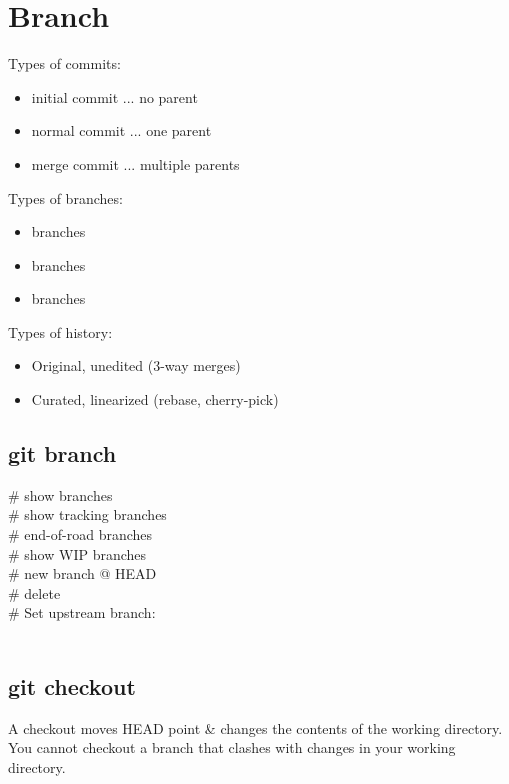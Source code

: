 \section{Branch}
Types of commits:
\begin{itemize}
    \item initial commit ... no parent
    \item normal commit ... one parent
    \item merge commit ... multiple parents
\end{itemize}
Types of branches:
\begin{itemize}
    \item {} branches
    \item {} branches
    \item {} branches
\end{itemize}
Types of history:
\begin{itemize}
    \item Original, unedited (3-way merges)
    \item Curated, linearized (rebase, cherry-pick)
\end{itemize}

\subsection*{git branch}
 \# show branches \\
 \# show tracking branches \\
 \# end-of-road branches \\
 \# show WIP branches \\
 \# new branch @ HEAD \\
 \# delete \\
\# Set upstream branch:\\
 \\


\subsection*{git checkout}
{\footnotesize
A checkout moves HEAD point \& changes the contents of the working directory.  You cannot checkout a branch that clashes with changes in your working directory.}

